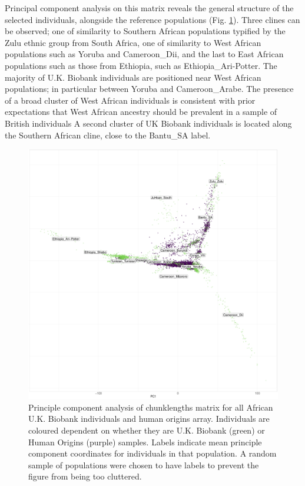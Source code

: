 Principal component analysis on this matrix reveals the general structure of the selected individuals, alongside the reference populations (Fig. \ref{fig:PCA_chunklengths_HumanOrigins_U.K.Biobank}). Three clines can be observed; one of similarity to Southern African populations typified by the Zulu ethnic group from South Africa, one of similarity to West African populations such as Yoruba and Cameroon\_Dii, and the last to East African populations such as those from Ethiopia, such as Ethiopia\_Ari-Potter. The majority of U.K. Biobank individuals are positioned near West African populations; in particular between Yoruba and Cameroon\_Arabe. The presence of a broad cluster of West African individuals is consistent with prior expectations that West African ancestry should be prevalent in a sample of British individuals A second cluster of UK Biobank individuals is located along the Southern African cline, close to the Bantu\_SA label. 

\begin{figure}[htp]
    \centering
    \includegraphics[width=1.0\textwidth]{../images/chapter3/ChromoPainter_PCA_UKB_HO.pdf}
    \caption{Principle component analysis of chunklengths matrix for all African U.K. Biobank individuals and human origins array. Individuals are coloured dependent on whether they are U.K. Biobank (green) or Human Origins (purple) samples. Labels indicate mean principle component coordinates for individuals in that population. A random sample of populations were chosen to have labels to prevent the figure from being too cluttered.}
    \label{fig:PCA_chunklengths_HumanOrigins_U.K.Biobank}
\end{figure}

